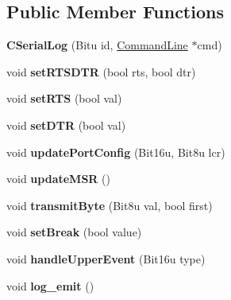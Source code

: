 \subsection*{Public Member Functions}
\begin{DoxyCompactItemize}
\item 
\hypertarget{classCSerialLog_ac85ad393523585308f37537e35d2a854}{{\bfseries C\-Serial\-Log} (Bitu id, \hyperlink{classCommandLine}{Command\-Line} $\ast$cmd)}\label{classCSerialLog_ac85ad393523585308f37537e35d2a854}

\item 
\hypertarget{classCSerialLog_a07b46d52193304ac68fc1d152cf03a8d}{void {\bfseries set\-R\-T\-S\-D\-T\-R} (bool rts, bool dtr)}\label{classCSerialLog_a07b46d52193304ac68fc1d152cf03a8d}

\item 
\hypertarget{classCSerialLog_a7bf3f7c3e616a54221f55ece39fa0296}{void {\bfseries set\-R\-T\-S} (bool val)}\label{classCSerialLog_a7bf3f7c3e616a54221f55ece39fa0296}

\item 
\hypertarget{classCSerialLog_a721015fc6ad91a2a168229a2a9ee8b2a}{void {\bfseries set\-D\-T\-R} (bool val)}\label{classCSerialLog_a721015fc6ad91a2a168229a2a9ee8b2a}

\item 
\hypertarget{classCSerialLog_ab6370173b4bc95c2c238221ff306d193}{void {\bfseries update\-Port\-Config} (Bit16u, Bit8u lcr)}\label{classCSerialLog_ab6370173b4bc95c2c238221ff306d193}

\item 
\hypertarget{classCSerialLog_a748338b322e45eb760536e276bb49953}{void {\bfseries update\-M\-S\-R} ()}\label{classCSerialLog_a748338b322e45eb760536e276bb49953}

\item 
\hypertarget{classCSerialLog_ae27998e3cc3dc200aedb7a6e9fff25bb}{void {\bfseries transmit\-Byte} (Bit8u val, bool first)}\label{classCSerialLog_ae27998e3cc3dc200aedb7a6e9fff25bb}

\item 
\hypertarget{classCSerialLog_a8b0065f974b55f40e4002e330d1470d9}{void {\bfseries set\-Break} (bool value)}\label{classCSerialLog_a8b0065f974b55f40e4002e330d1470d9}

\item 
\hypertarget{classCSerialLog_a5f6118a9068bb54bfc096156f315a056}{void {\bfseries handle\-Upper\-Event} (Bit16u type)}\label{classCSerialLog_a5f6118a9068bb54bfc096156f315a056}

\item 
\hypertarget{classCSerialLog_a33e78343606d93cc423e24bd21fdb7d3}{void {\bfseries log\-\_\-emit} ()}\label{classCSerialLog_a33e78343606d93cc423e24bd21fdb7d3}

\end{DoxyCompactItemize}
